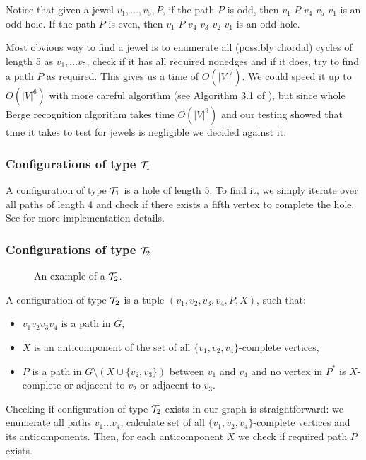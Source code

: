 Notice that given a jewel $v_1, \ldots, v_5, P$, if the path $P$ is odd, then $v_1$-$P$-$v_4$-$v_5$-$v_1$ is an odd hole. If the path $P$ is even, then $v_1$-$P$-$v_4$-$v_3$-$v_2$-$v_1$ is an odd hole.

Most obvious way to find a jewel is to enumerate all (possibly chordal) cycles of length 5 as $v_1, \ldots v_5$, check if it has all required nonedges and if it does, try to find a path $P$ as required. This gives us a time of $O(|V|^7)$. We could speed it up to $O(|V|^6)$ with more careful algorithm (see Algorithm 3.1 of \cite{MC05}), but since whole Berge recognition algorithm takes time $O(|V|^9)$ and our testing showed that time it takes to test for jewels is negligible we decided against it.

\subsubsection{Configurations of type $\mathcal{T}_1$}

A configuration of type $\mathcal{T}_1$ is a hole of length 5. To find it, we simply iterate over all paths of length 4 and check if there exists a fifth vertex to complete the hole. See  for more implementation details.

\subsubsection{Configurations of type $\mathcal{T}_2$}

\begin{wrapfigure}{r}{0.35\textwidth}
	
	\caption{An example of a $\mathcal{T}_2$.}%
	\vspace{-.5cm}
\end{wrapfigure}

A configuration of type $\mathcal{T}_2$ is a tuple $(v_1, v_2, v_3, v_4, P, X)$, such that:
\begin{itemize}
	\item $v_1v_2v_3v_4$ is a path in $G$,
	\item $X$ is an anticomponent of the set of all $\{v_1, v_2, v_4\}$-complete vertices,
	\item $P$ is a path in $G\setminus(X \cup \{v_2, v_3\})$ between $v_1$ and $v_4$ and no vertex in $P^*$ is $X$-complete or adjacent to $v_2$ or adjacent to $v_3$.
\end{itemize}

Checking if configuration of type $\mathcal{T}_2$ exists in our graph is straightforward: we enumerate all paths $v_1\ldots v_4$, calculate set of all $\{v_1, v_2, v_4\}$-complete vertices and its anticomponents. Then, for each anticomponent $X$ we check if required path $P$ exists.

